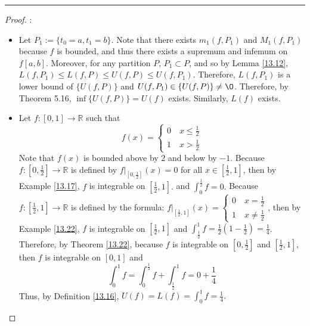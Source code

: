 \documentclass[openany, amssymb, psamsfonts]{amsart}
\newcommand{\bbR}{\mathbb{R}}
\renewcommand{\emptyset}{\O}
\theoremstyle{definition}
\numberwithin{equation}{section}
\begin{document}
\vspace{4pt}     \hrule   \vspace{4pt} \begin{proof}:\\
\begin{itemize}
    \item Let $P_1 := \{t_0 = a, t_1 = b\}$. Note that there exists $m_1(f, P_1)$ and $M_1(f, P_1)$ because $f$ is bounded, and thus there exists a supremum and infemum on $f[a,b]$. Moreover, for any partition $P$, $P_1 \subset P$, and so by Lemma \ref{13.12}, $L(f,P_1)\leq L(f,P)\leq U(f,P)\leq U(f,P_1)$. Therefore, $L(f,P_1)$ is a lower bound of $\{U(f,P)\}$ and $U(f,P_1)\in \{U(f,P)\}\neq \emptyset$. Therefore, by Theorem 5.16, $\inf\{U(f,P)\} = U(f)$ exists. Similarly, $L(f)$ exists. 
    
    \item Let $f: [0,1] \to \bbR$ such that \[f(x) = \begin{cases}
        0 \quad x\leq \frac{1}{2}\\
        1 \quad x> \frac{1}{2}
    \end{cases}\] Note that $f(x)$ is bounded above by $2$ and below by $-1$. Because $f: [0,\frac{1}{2}] \to \bbR$ is defined by $f|_{[0,\frac{1}{2}]}(x) = 0$ for all $x\in [\frac{1}{2}, 1]$, then by Example \ref{13.17}, $f$ is integrable on $[\frac{1}{2}, 1].$ and $\int_0^\frac{1}{2} f = 0.$ Because $f: [\frac{1}{2}, 1] \to \bbR$ is defined by the formula: $f|_{[\frac{1}{2}, 1]}(x) = \begin{cases}
        0 \quad x = \frac{1}{2}\\
        1 \quad x \neq \frac{1}{2}
    \end{cases}$, then by Example \ref{13.22}, $f$ is integrable on $[\frac{1}{2}, 1]$ and $\int_{\frac{1}{2}}^1f = \frac{1}{2}(1-\frac{1}{2}) = \frac{1}{4}$. Therefore, by Theorem \ref{13.22}, because $f$ is integrable on $[0,\frac{1}{2}]$ and $[\frac{1}{2}, 1]$, then $f$ is integrable on $[0,1]$ and \[\int_0^1f = \int_0^\frac{1}{2} f + \int_{\frac{1}{2}}^1f= 0 + \frac{1}{4}\]
    Thus, by Definition \ref{13.16}, $U(f) = L(f) = \int_0^1f = \frac{1}{4}.$
    

\end{itemize}
\end{proof}
\end{document}
